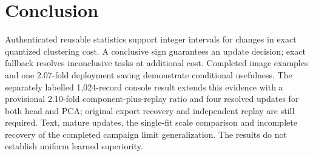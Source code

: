 \section{Conclusion}\label{sec:conclusion}
Authenticated reusable statistics support integer intervals for changes in
exact quantized clustering cost. A conclusive sign guarantees an update
decision; exact fallback resolves inconclusive tasks at additional cost.
Completed image examples and one 2.07-fold deployment saving demonstrate
conditional usefulness. The separately labelled 1,024-record console result
extends this evidence with a provisional 2.10-fold component-plus-replay
ratio and four resolved updates for both head and PCA; original export
recovery and independent replay are still required. Text, mature updates, the single-fit scale comparison and incomplete
recovery of the completed campaign limit generalization. The results do not
establish uniform learned superiority.
